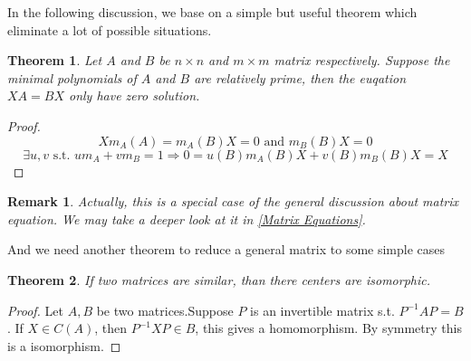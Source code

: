 \documentclass{book}
\newtheorem{theorem}{Theorem}[section]
\newtheorem*{remark}{Remark}
\theoremstyle{definition}
\begin{document}
In the following discussion, we base on a simple but useful theorem which eliminate a lot of possible situations.
\begin{theorem}
\label{relatively prime zero solution}
Let $A$ and $B$ be $n\times n$ and $m \times m$ matrix respectively. Suppose the minimal polynomials of $A$ and $B$ are relatively prime, then the euqation $XA=BX$ only have zero solution.
\end{theorem}
\begin{proof}
\[Xm_A(A)=m_A(B)X=0\text{ and }m_B(B)X=0\]
\[\exists u,v \text{ s.t. } um_A+vm_B=1\Longrightarrow 0=u(B)m_A(B)X+v(B)m_B(B)X=X\]
\end{proof}
\begin{remark}
Actually, this is a special case of the general discussion about matrix equation. We may take a deeper look at it in \ref{Matrix Equations}.
\end{remark}
And we need another theorem to reduce a general matrix to some simple cases
\begin{theorem}
If two matrices are similar, than there centers are isomorphic.
\end{theorem}
\begin{proof}
Let $A,B$ be two matrices.Suppose $P$ is an invertible matrix s.t. $P^{-1}AP=B$. If $X\in C(A)$, then $P^{-1}XP\in B$, this gives a homomorphism. By symmetry this is a isomorphism.
\end{proof}
\end{document}
